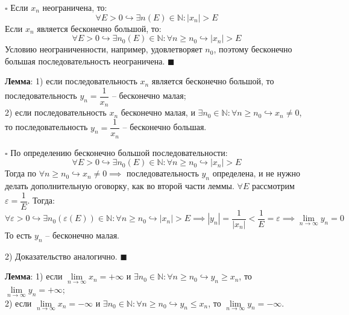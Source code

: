 \documentclass[12pt, a4paper, reqno]{article}
\begin{document}
    $\square$ Если $x_n$ неограничена, то:
    \begin{equation*}
        \forall E > 0 \hookrightarrow \exists n(E)\in\mathbb{N}: |x_n| > E
    \end{equation*}
    Если $x_n$ является бесконечно большой, то:
    \begin{equation*}
        \forall E > 0 \hookrightarrow \exists n_0(E)\in\mathbb{N}: \forall n \geq n_0
        \hookrightarrow |x_n| > E
    \end{equation*}
    Условию неограниченности, например, удовлетворяет $n_0$, поэтому бесконечно большая
    последовательность неограничена. $\blacksquare$

    \textbf{Лемма}: 1) если последовательность $x_n$ является бесконечно большой, то
    последовательность $y_n = \dfrac{1}{x_n}$ -- бесконечно малая;\\
    2) если последовательность $x_n$ бесконечно малая, и $\exists n_0\in\mathbb{N}: \forall n \geq
    n_0 \hookrightarrow x_n \neq 0$, то последовательность $y_n = \dfrac{1}{x_n}$ -- бесконечно
    большая.

    $\square$ По определению бесконечно большой последовательности:
    \begin{equation*}
        \forall E > 0 \hookrightarrow \exists n_0(E)\in\mathbb{N}: \forall n \geq n_0
        \hookrightarrow |x_n| > E
    \end{equation*}
    Тогда по $\forall n \geq n_0 \hookrightarrow x_n \neq 0 \implies$ последовательность $y_n$
    определена, и не нужно делать дополнительную оговорку, как во второй части леммы. $\forall E$
    рассмотрим $\varepsilon = \dfrac{1}{E}$. Тогда:
    \begin{equation*}
        \forall \varepsilon > 0 \hookrightarrow \exists n_0(\varepsilon(E))\in\mathbb{N}: \forall n
        \geq n_0 \hookrightarrow |x_n| > E \implies |y_n| = \dfrac{1}{|x_n|} < \dfrac{1}{E} =
        \varepsilon \implies \lim\limits_{n\to\infty} y_n = 0
    \end{equation*}
    То есть $y_n$ -- бесконечно малая.

    2) Доказательство аналогично. $\blacksquare$

    \textbf{Лемма}: 1) если $\lim\limits_{n\to\infty} x_n = +\infty$ и $\exists n_0\in\mathbb{N}:
    \forall n \geq n_0 \hookrightarrow y_n \geq x_n$, то $\lim\limits_{n\to\infty} y_n = +\infty$;\\
    2) если $\lim\limits_{n\to\infty} x_n = -\infty$ и $\exists n_0\in\mathbb{N}: \forall n \geq
    n_0 \hookrightarrow y_n \leq x_n$, то $\lim\limits_{n\to\infty} y_n = -\infty$.
\end{document}
